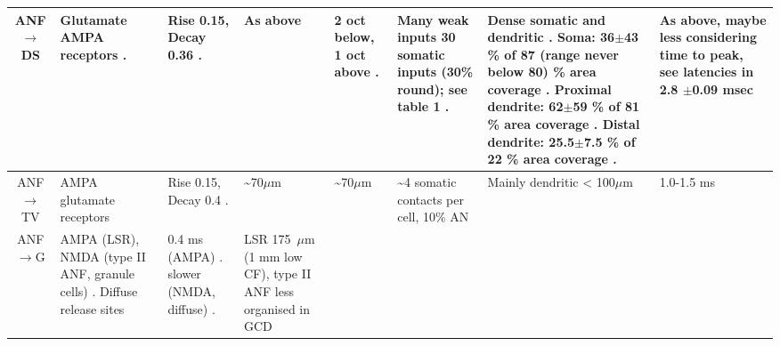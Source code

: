 \begin{longtable}{cXXXXXXX}
\\ \midrule
ANF\ensuremath{\rightarrow}DS                   
& %
Glutamate  AMPA receptors \citep{FerragamoGoldingEtAl:1998a,WentholdHunterEtAl:1993}.
& %
Rise 0.15, Decay 0.36 \citep{GardnerTrussellEtAl:1999,Oertel:1983}.  
& %
As above
& %
2 oct below, 1 oct above \citep{PalmerJiangEtAl:1996}. 
& %
Many weak inputs \citep{FerragamoGoldingEtAl:1998a} 
30 somatic inputs (30\% round); see table 1 \citep{SmithRhode:1989}.
& %
Dense somatic and dendritic \citep{Cant:1981,Cant:1982,RyugoWrightEtAl:1993}.
Soma: 36$\pm$43 \%  of 87 (range never below 80) \% area coverage   \citep[cat][]{SmithRhode:1989}. 
Proximal dendrite: 62$\pm$59 \%  of 81 \% area coverage   \citep[cat][]{SmithRhode:1989}. 
Distal dendrite: 25.5$\pm$7.5 \%  of 22 \% area coverage   \citep[cat][]{SmithRhode:1989}. 
& %
As above, maybe less considering time to peak,
see latencies in \citep{PaoliniClark:1999} 
2.8 $\pm$0.09 msec \citep[Oc latency]{RhodeSmith:1986} 
\\ \midrule
ANF \ensuremath{\rightarrow}TV                       
& %
AMPA glutamate receptors \citep{ZhangOertel:1993}                          
& %
Rise 0.15, Decay 0.4 \citep{GardnerTrussellEtAl:1999}.
& %
\~{}70$\mu$m \citep[mouse][]{SpirouDavisEtAl:1999}
& %
\~{}70$\mu$m \citep[mouse][]{ZhangOertel:1993,SpirouDavisEtAl:1999}
& %
\~{}4 somatic contacts per cell, 10\% AN \citep{Alibardi:1999}
& %
Mainly dendritic {\textless} 100$\mu$m \citep{Alibardi:1999,Liberman:1993,RubioJuiz:2004,SpirouDavisEtAl:1999}  
& %
1.0-1.5 ms \citep{ZhangOertel:1993}
\\ \midrule
ANF\ensuremath{\rightarrow}G                      
& %
AMPA (LSR), NMDA (type II ANF, granule cells)
\citep{Cant:1992,FerragamoGoldingEtAl:1998a,RyugoWrightEtAl:1993,Ryugo:1992,RyugoParks:2003}.
Diffuse release sites \citep{HurdHutsonEtAl:1999}             
& %
0.4 ms (AMPA)   \citep{GardnerTrussellEtAl:1999}. 
slower (NMDA, diffuse) \citep{HurdHutsonEtAl:1999}.    
& %
LSR 175~$\mu$m (1 mm low CF)\citep{Ryugo:2008}, type II ANF less organised in GCD \citep{WeedmanPongstapornEtAl:1996,RyugoWrigthEtAl:1993}

\end{longtable}

